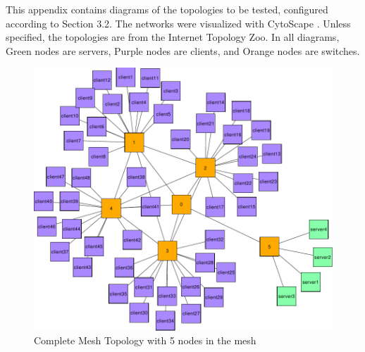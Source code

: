 This appendix contains diagrams of the topologies to be tested, configured according to Section 3.2. The networks were visualized with CytoScape \cite{shannon_cytoscape_2003}. Unless specified, the topologies are from the Internet Topology Zoo. In all diagrams, Green nodes are servers, Purple nodes are clients, and Orange nodes are switches.
\begin{figure}
    \centering
    \includegraphics[width=\linewidth]{Networks/Complete Graph_final.pdf}
    \caption{Complete Mesh Topology with 5 nodes in the mesh}
    \label{fig:CompleteMesh}
\end{figure}

